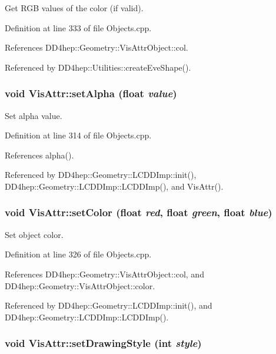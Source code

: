 Get RGB values of the color (if valid). 

Definition at line 333 of file Objects.cpp.

References DD4hep::Geometry::VisAttrObject::col.

Referenced by DD4hep::Utilities::createEveShape().\hypertarget{class_d_d4hep_1_1_geometry_1_1_vis_attr_aeca9848b297213098eac1fd882fd7680}{
\subsubsection[{setAlpha}]{\setlength{\rightskip}{0pt plus 5cm}void VisAttr::setAlpha (float {\em value})}}
\label{class_d_d4hep_1_1_geometry_1_1_vis_attr_aeca9848b297213098eac1fd882fd7680}


Set alpha value. 

Definition at line 314 of file Objects.cpp.

References alpha().

Referenced by DD4hep::Geometry::LCDDImp::init(), DD4hep::Geometry::LCDDImp::LCDDImp(), and VisAttr().\hypertarget{class_d_d4hep_1_1_geometry_1_1_vis_attr_aa9f0dec964e94cbb6df397e242ac57b5}{
\subsubsection[{setColor}]{\setlength{\rightskip}{0pt plus 5cm}void VisAttr::setColor (float {\em red}, \/  float {\em green}, \/  float {\em blue})}}
\label{class_d_d4hep_1_1_geometry_1_1_vis_attr_aa9f0dec964e94cbb6df397e242ac57b5}


Set object color. 

Definition at line 326 of file Objects.cpp.

References DD4hep::Geometry::VisAttrObject::col, and DD4hep::Geometry::VisAttrObject::color.

Referenced by DD4hep::Geometry::LCDDImp::init(), and DD4hep::Geometry::LCDDImp::LCDDImp().\hypertarget{class_d_d4hep_1_1_geometry_1_1_vis_attr_a37d208476b8631402fe4777061abfc81}{
\subsubsection[{setDrawingStyle}]{\setlength{\rightskip}{0pt plus 5cm}void VisAttr::setDrawingStyle (int {\em style})}}
\label{class_d_d4hep_1_1_geometry_1_1_vis_attr_a37d208476b8631402fe4777061abfc81}


